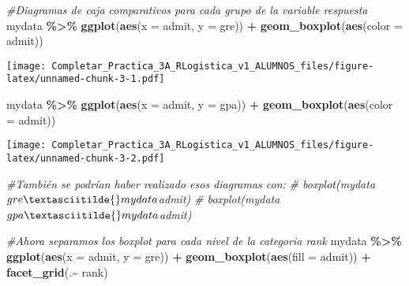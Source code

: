\documentclass[
]{article}
\newenvironment{Shaded}{\begin{snugshade}}{\end{snugshade}}
\newcommand{\AttributeTok}[1]{\textcolor[rgb]{0.13,0.29,0.53}{#1}}
\newcommand{\CommentTok}[1]{\textcolor[rgb]{0.56,0.35,0.01}{\textit{#1}}}
\newcommand{\FunctionTok}[1]{\textcolor[rgb]{0.13,0.29,0.53}{\textbf{#1}}}
\newcommand{\NormalTok}[1]{#1}
\newcommand{\SpecialCharTok}[1]{\textcolor[rgb]{0.81,0.36,0.00}{\textbf{#1}}}
\begin{document}
\begin{Shaded}
\begin{Highlighting}[]
\CommentTok{\#Diagramas de caja comparativos para cada grupo de la variable respuesta}
\NormalTok{mydata }\SpecialCharTok{\%\textgreater{}\%}
  \FunctionTok{ggplot}\NormalTok{(}\FunctionTok{aes}\NormalTok{(}\AttributeTok{x =}\NormalTok{ admit, }\AttributeTok{y =}\NormalTok{ gre)) }\SpecialCharTok{+}
  \FunctionTok{geom\_boxplot}\NormalTok{(}\FunctionTok{aes}\NormalTok{(}\AttributeTok{color =}\NormalTok{ admit))}
\end{Highlighting}
\end{Shaded}

\texttt{[image: Completar\_Practica\_3A\_RLogistica\_v1\_ALUMNOS\_files/figure-latex/unnamed-chunk-3-1.pdf]}

\begin{Shaded}
\begin{Highlighting}[]
\NormalTok{mydata }\SpecialCharTok{\%\textgreater{}\%}
  \FunctionTok{ggplot}\NormalTok{(}\FunctionTok{aes}\NormalTok{(}\AttributeTok{x =}\NormalTok{ admit, }\AttributeTok{y =}\NormalTok{ gpa)) }\SpecialCharTok{+}
  \FunctionTok{geom\_boxplot}\NormalTok{(}\FunctionTok{aes}\NormalTok{(}\AttributeTok{color =}\NormalTok{ admit))}
\end{Highlighting}
\end{Shaded}

\texttt{[image: Completar\_Practica\_3A\_RLogistica\_v1\_ALUMNOS\_files/figure-latex/unnamed-chunk-3-2.pdf]}

\begin{Shaded}
\begin{Highlighting}[]
\CommentTok{\#También se podrían haber realizado esos diagramas con:}
\CommentTok{\# boxplot(mydata$gre \textasciitilde{} mydata$admit)}
\CommentTok{\# boxplot(mydata$gpa \textasciitilde{} mydata$admit)}
\end{Highlighting}
\end{Shaded}

\begin{Shaded}
\begin{Highlighting}[]
\CommentTok{\#Ahora separamos los boxplot para cada nivel de la categoria rank}
\NormalTok{mydata }\SpecialCharTok{\%\textgreater{}\%}
  \FunctionTok{ggplot}\NormalTok{(}\FunctionTok{aes}\NormalTok{(}\AttributeTok{x =}\NormalTok{ admit, }\AttributeTok{y =}\NormalTok{ gre)) }\SpecialCharTok{+}
  \FunctionTok{geom\_boxplot}\NormalTok{(}\FunctionTok{aes}\NormalTok{(}\AttributeTok{fill =}\NormalTok{ admit)) }\SpecialCharTok{+}
  \FunctionTok{facet\_grid}\NormalTok{(.}\SpecialCharTok{\textasciitilde{}}\NormalTok{ rank)}
\end{Highlighting}
\end{Shaded}
\end{document}
